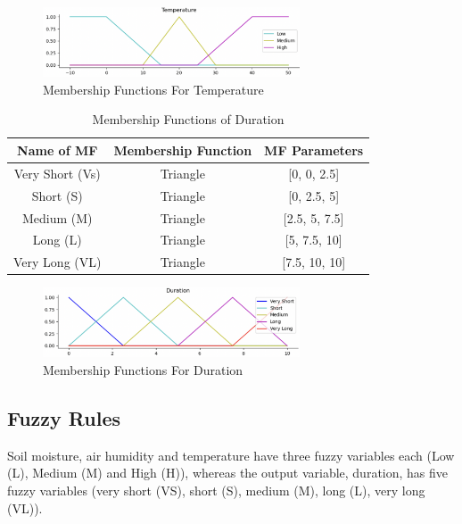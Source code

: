 \documentclass[conference]{IEEEtran}
\begin{document}
\begin{figure}[!ht]
    \centering
     \includegraphics[width=3in]{graphs/temperature.png}
    \caption{Membership Functions For Temperature} 
    \label{figure:temperature}
\end{figure}

 \begin{table}[!ht]
    \caption{Membership Functions of Duration}
    \label{table:duration_mem}
    \centering
    \begin{tabular}{c c c}
        \hline 
        \bfseries Name of MF & \bfseries Membership Function & \bfseries MF Parameters\\
        \hline  
        Very Short (Vs) & Triangle & [0, 0, 2.5]\\
        Short (S) & Triangle & [0, 2.5, 5]\\
        Medium (M) & Triangle & [2.5, 5, 7.5]\\
        Long (L) & Triangle & [5, 7.5, 10]\\
        Very Long (VL) & Triangle & [7.5, 10, 10]\\
    \hline
    \end{tabular}
\end{table}

\begin{figure}[!ht]
    \centering
     \includegraphics[width=3in]{graphs/duration.png}
    \caption{Membership Functions For Duration} 
    \label{figure:duration}
\end{figure}

\subsection{Fuzzy Rules}
Soil moisture, air humidity and temperature have three fuzzy variables each (Low (L), Medium (M) and High (H)), whereas the output variable, duration, has five fuzzy variables (very short (VS), short (S), medium (M), long (L), very long (VL)). 
\end{document}
